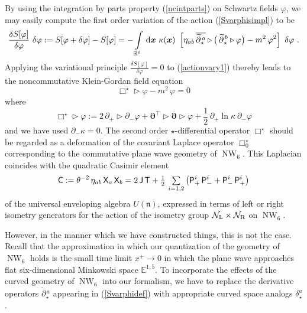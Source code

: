 \documentclass[11pt,a4paper]{article}
\DeclareMathOperator{\NW}{NW}
\newcommand{\1}{\mathbb{1}}
\newcommand{\mbf}[1]{{\boldsymbol {#1} }}
\def\dd{{\rm d}}
\def\P{{\sf P}}
\def\T{{\sf T}}
\def\X{{\sf X}}
\def\J{{\sf J}}
\def\mdell{{\mbf\partial}}
\def\mfn{{\mathfrak n}}
\newcommand{\R}{\real}
\newcommand{\real}{{\mathbb R}} %
\newcommand{\eucl}{{\mathbb E}}
\begin{document}
By using the integration by parts property (\ref{ncintparts}) on
Schwartz fields $\varphi$, we may easily compute the first order
variation of the action (\ref{Svarphisimpl}) to be
\begin{equation}
\frac{\delta S[\varphi]}{\delta\varphi}~\delta\varphi:=
S[\varphi+\delta\varphi]-S[\varphi]=-\int\limits_{\R^6}\,\dd\mbf x~
\kappa(\mbf x)~\left[\eta_{ab}\,\overline{\widetilde
{\partial}{}_\star^{\,a}}\triangleright\bigl(\,\widetilde
{\partial}{}_\star^{\,b}\triangleright\varphi\bigr)-m^2\,\varphi^2
\right]~\delta\varphi \ .
\label{actionvary1}\end{equation}
Applying the variational principle $\frac{\delta
  S[\varphi]}{\delta\varphi}=0$ to (\ref{actionvary1}) thereby leads
to the noncommutative Klein-Gordan field equation
\begin{equation}
\Box^\star\triangleright\varphi-m^2\,\varphi=0
\label{NCeom}\end{equation}
where
\begin{equation}
\Box^\star\triangleright\varphi:=2\,\partial_+\triangleright
\partial_-\varphi+\mdell^\top\triangleright
\overline{\mdell}\triangleright\varphi+\mbox{$\frac12$}\,
\partial_+\ln\kappa~\partial_-\varphi
\label{Boxstardef}\end{equation}
and we have used $\partial_-\kappa=0$. The second order
$\star$-differential operator $\Box^\star$ should be regarded as a deformation
of the covariant Laplace operator $\Box_0^\star$ corresponding to the
commutative plane wave geometry of $\NW_6$. This Laplacian coincides
with the quadratic Casimir element
\begin{equation}
{\sf C}:=\theta^{-2}\,\eta_{ab}\,\X_a\,\X_b
=2\,\J\,\T+\mbox{$\frac12\,\sum\limits_{i=1,2}$}\,\bigl(
\P_+^i\,\P_-^i+\P_-^i\,\P_+^i\bigr)
\label{quadCasimir}\end{equation}
of the universal enveloping algebra $U(\mfn)$, expressed in terms of
left or right isometry generators for the action of the isometry group
$\mathcal{N}_{\rm L}\times\mathcal{N}_{\rm R}$ on $\NW_6$.

However, in the manner which we have constructed things, this is not
the case. Recall that the approximation in which our quantization of
the geometry of $\NW_6$ holds is the small time limit $x^+\to0$ in
which the plane wave approaches flat six-dimensional Minkowski space
$\eucl^{1,5}$. To incorporate the effects of the curved geometry of
$\NW_6$ into our formalism, we have to replace the derivative
operators $\widetilde{\partial}{}_\star^{\,a}$ appearing in
(\ref{Svarphidef}) with appropriate curved space analogs
$\delta_\star^a$.
\end{document}
